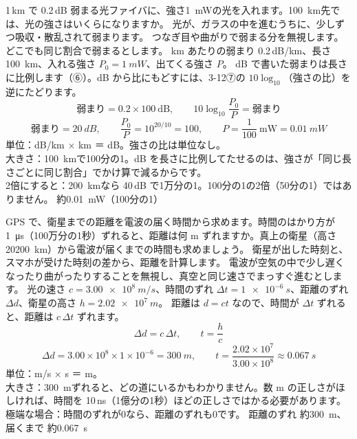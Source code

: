 \begin{phreidai}[光ファイバで 100 km 送る]\label{ph:波-14:ex4}
1\,km で 0.2\,dB 弱まる光ファイバに、強さ\qty{1}{mW}の光を入れます。\qty{100}{km}先では、光の強さはいくらになりますか。
\phbamen
光が、ガラスの中を進むうちに、少しずつ吸収・散乱されて弱まります。
\phmushi
つなぎ目や曲がりで弱まる分を無視します。どこでも同じ割合で弱まるとします。
 km あたりの弱まり 0.2\,dB/km、長さ\qty{100}{km}、入れる強さ $P_0=\qty{1}{mW}$、出てくる強さ $P$。
\phriyu
dB で書いた弱まりは長さに比例します（⑥）。dB から比にもどすには、3-12⑦の $10\log_{10}$（強さの比）を逆にたどります。
\phtateru
\[\text{弱まり}=0.2\times100\ \text{dB},\qquad 10\log_{10}\frac{P_0}{P}=\text{弱まり}\]
\phtoku
\[\text{弱まり}=\qty{20}{dB},\qquad \frac{P_0}{P}=10^{20/10}=100,\qquad P=\frac{1}{100}\ \text{mW}=\qty{0.01}{mW}\]
\phtashikame
単位：dB/km × km ＝ dB。強さの比は単位なし。\\
大きさ：\qty{100}{km}で100分の1。dB を長さに比例してたせるのは、強さが「同じ長さごとに同じ割合」でかけ算で減るからです。\\
2倍にすると：\qty{200}{km}なら 40\,dB で1万分の1。100分の1の2倍（50分の1）ではありません。
\kotae 約\qty{0.01}{mW}（100分の1）
\end{phreidai}

\begin{phreidai}\label{ph:波-14:ex5}
GPS で、衛星までの距離を電波の届く時間から求めます。時間のはかり方が\qty{1}{\micro s}（100万分の1秒）ずれると、距離は何 m ずれますか。真上の衛星（高さ\qty{20200}{km}）から電波が届くまでの時間も求めましょう。
\phbamen
衛星が出した時刻と、スマホが受けた時刻の差から、距離を計算します。
\phmushi
電波が空気の中で少し遅くなったり曲がったりすることを無視し、真空と同じ速さでまっすぐ進むとします。
\phzu
光の速さ $c=\qty{3.00e8}{m/s}$、時間のずれ $\Delta t=\qty{1e-6}{s}$、距離のずれ $\Delta d$、衛星の高さ $h=\qty{2.02e7}{m}$。
\phriyu
距離は $d=ct$ なので、時間が $\Delta t$ ずれると、距離は $c\,\Delta t$ ずれます。
\phtateru
\[\Delta d=c\,\Delta t,\qquad t=\frac{h}{c}\]
\phtoku
\[\Delta d=3.00\times10^8\times1\times10^{-6}=\qty{300}{m},\qquad t=\frac{2.02\times10^7}{3.00\times10^8}\approx\qty{0.067}{s}\]
\phtashikame
単位：m/s × s ＝ m。\\
大きさ：\qty{300}{m}ずれると、どの道にいるかもわかりません。数 m の正しさがほしければ、時間を 10\,ns（1億分の1秒）ほどの正しさではかる必要があります。\\
極端な場合：時間のずれが0なら、距離のずれも0です。
\kotae 距離のずれ 約\qty{300}{m}、届くまで 約\qty{0.067}{s}
\end{phreidai}

